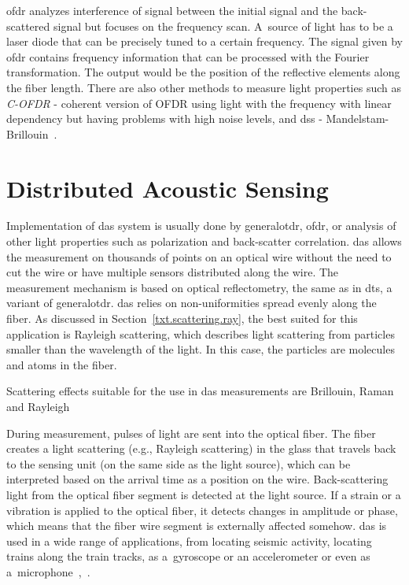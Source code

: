 \ac{ofdr} analyzes interference of signal between the initial signal and the back-scattered signal but focuses on the frequency scan. A~source of light has to be a laser diode that can be precisely tuned to a certain frequency. The signal given by \ac{ofdr} contains frequency information that can be processed with the Fourier transformation. The output would be the position of the reflective elements along the fiber length. There are also other methods to measure light properties such as \textit{C-OFDR} - coherent version of OFDR using light with the frequency with linear dependency but having problems with high noise levels, and \ac{dss} - Mandelstam-Brillouin~\cite{kislov_das_newparadigm}.






























\newpage
\section{Distributed Acoustic Sensing}\label{txt.das}

Implementation of \ac{das} system is usually done by \ac{generalotdr}, \ac{ofdr}, or analysis of other light properties such as polarization and back-scatter correlation. \ac{das} allows the measurement on thousands of points on an optical wire without the need to cut the wire or have multiple sensors distributed along the wire. The measurement mechanism is based on optical reflectometry, the same as in \ac{dts}, a variant of \ac{generalotdr}. \ac{das} relies on non-uniformities spread evenly along the fiber. As discussed in Section~\ref{txt.scattering.ray}, the best suited for this application is Rayleigh scattering, which describes light scattering from particles smaller than the wavelength of the light. In this case, the particles are molecules and atoms in the fiber.

Scattering effects suitable for the use in \ac{das} measurements are Brillouin, Raman and Rayleigh 

During measurement, pulses of light are sent into the optical fiber. The fiber creates a light scattering (e.g., Rayleigh scattering) in the glass that travels back to the sensing unit (on the same side as the light source), which can be interpreted based on the arrival time as a position on the wire. Back-scattering light from the optical fiber segment is detected at the light source. If a strain or a vibration is applied to the optical fiber, it detects changes in amplitude or phase, which means that the fiber wire segment is externally affected somehow. \ac{das} is used in a wide range of applications, from locating seismic activity, locating trains along the train tracks, as a~gyroscope or an accelerometer or even as a~microphone~\cite{WangYu2017RDVM},~\cite{kislov_das_newparadigm}.

